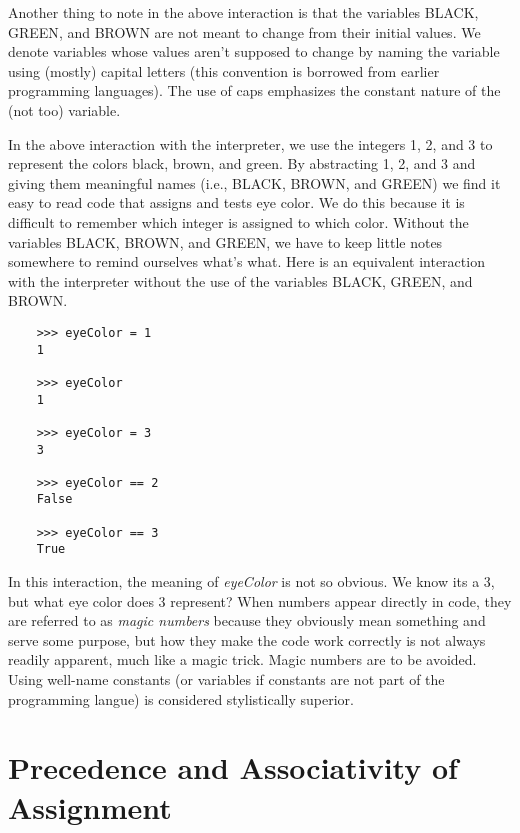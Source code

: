 Another thing to note in the above interaction is
that the
variables {\sf BLACK}, {\sf GREEN}, and {\sf BROWN}
are not meant
to change from their initial values.
We denote variables whose values aren't supposed to change
by naming the
variable using (mostly) capital letters (this convention is borrowed
from earlier programming languages).
The use of caps emphasizes the constant nature of the (not too) variable.

In the above interaction with the interpreter, we use the integers 1, 2,
and 3 to represent the colors black, brown, and green. By abstracting 1,
2, and 3 and giving them meaningful names (i.e., {\sf BLACK}, {\sf BROWN},
and {\sf GREEN}) we find it easy to read code that
assigns and tests eye color.
We do this because it is difficult to remember which integer
is assigned to which color. Without the variables {\sf BLACK}, {\sf BROWN}, and
{\sf GREEN}, we have to keep little notes somewhere to remind ourselves what's
what. Here is an equivalent interaction with the interpreter without
the use of the variables {\sf BLACK}, {\sf GREEN}, and {\sf BROWN}.

\color{CodeGreen}
\begin{codesize}
\begin{verbatim}
    >>> eyeColor = 1
    1
    
    >>> eyeColor
    1
    
    >>> eyeColor = 3
    3
    
    >>> eyeColor == 2
    False
    
    >>> eyeColor == 3
    True
\end{verbatim}
\end{codesize}
\color{black}
    
In this interaction, the meaning of {\it eyeColor}
is not so obvious. We know its a 3, but what eye color
does 3 represent? When numbers appear directly in code,
they are referred to as {\it magic numbers} because they
obviously mean something and serve some purpose,
but how they make the code work correctly
is not always readily apparent,
much like a magic trick.
Magic numbers are to be avoided. Using well-name constants
(or variables if constants are not part of the programming
langue) is considered stylistically superior.

\section{Precedence and Associativity of Assignment}

